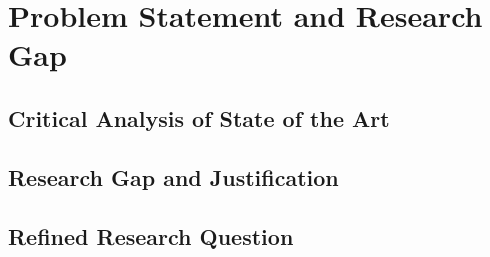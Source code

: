 \chapter{Problem Statement and Research Gap}\label{ch:research_gap}

\section{Critical Analysis of State of the Art}

\section{Research Gap and Justification}

\section{Refined Research Question}
